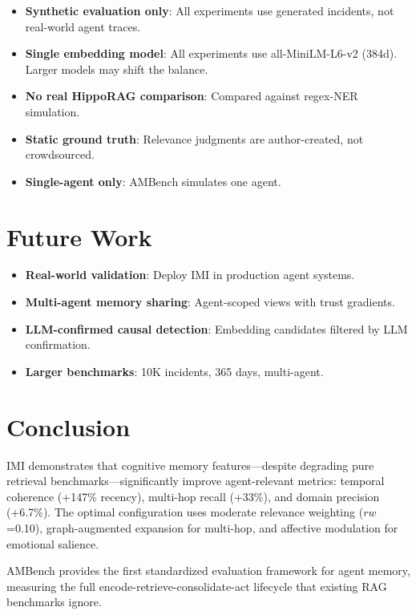 \documentclass[11pt]{article}
\begin{document}
\begin{itemize}
  \item \textbf{Synthetic evaluation only}: All experiments use generated incidents,
    not real-world agent traces.
  \item \textbf{Single embedding model}: All experiments use all-MiniLM-L6-v2 (384d).
    Larger models may shift the balance.
  \item \textbf{No real HippoRAG comparison}: Compared against regex-NER simulation.
  \item \textbf{Static ground truth}: Relevance judgments are author-created, not
    crowdsourced.
  \item \textbf{Single-agent only}: AMBench simulates one agent.
\end{itemize}

\section{Future Work}

\begin{itemize}
  \item \textbf{Real-world validation}: Deploy IMI in production agent systems.
  \item \textbf{Multi-agent memory sharing}: Agent-scoped views with trust gradients.
  \item \textbf{LLM-confirmed causal detection}: Embedding candidates filtered
    by LLM confirmation.
  \item \textbf{Larger benchmarks}: 10K incidents, 365 days, multi-agent.
\end{itemize}

\section{Conclusion}

IMI demonstrates that cognitive memory features---despite degrading pure
retrieval benchmarks---significantly improve agent-relevant metrics:
temporal coherence (+147\% recency), multi-hop recall (+33\%), and domain
precision (+6.7\%). The optimal configuration uses moderate relevance weighting
($rw$=0.10), graph-augmented expansion for multi-hop, and affective modulation
for emotional salience.

AMBench provides the first standardized evaluation framework for agent memory,
measuring the full encode-retrieve-consolidate-act lifecycle that existing
RAG benchmarks ignore.
\end{document}
